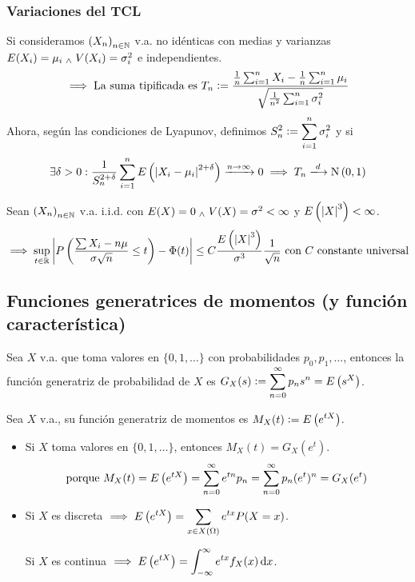 
\subsubsection{Variaciones del TCL}

Si consideramos $\left(X_n\right)_{n\in \mathbb{N}}$ v.a. no idénticas con medias y varianzas $E(X_i) = \mu_i \; _{\wedge} \; V(X_i) = \sigma_i^2$ e independientes.
\[\implies \text{La suma tipificada es } T_n \vcentcolon= \frac{\frac{1}{n} \sum_{i=1}^{n} X_i - \frac{1}{n}\sum_{i=1}^{n} \mu_i}{\sqrt{\frac{1}{n^2}\sum_{i=1}^{n} \sigma_i^2}}\]
Ahora, según las condiciones de Lyapunov, definimos $\displaystyle S_n^2 \vcentcolon= \sum_{i=1}^{n} \sigma_i^2$ y si
\[\exists \delta > 0 : \frac{1}{S_n^{2+\delta}} \sum_{i=1}^{n} E\left(\abs{X_i - \mu_i}^{2+\delta}\right) \xrightarrow{n\to\infty} 0 \implies T_n \xlongrightarrow{d} \normal{0,1}\]

\begin{teo}
	Sean $\left(X_n\right)_{n\in \mathbb{N}}$ v.a. i.i.d. con $E(X) = 0 \; _{\wedge} \; V(X) = \sigma^2 < \infty$ y $E\left(\left|X\right|^3\right) < \infty$.
	\[\implies \sup_{t\in \mathbb{R}} \left|P\left(\frac{\sum X_i - n\mu}{\sigma \sqrt{n}} \leq t\right) - \Phi(t)\right| \leq C \frac{E\left(\left|X\right|^3\right)}{\sigma^3}\frac{1}{\sqrt{n}} \text{ con } C \text{ constante universal}\]
\end{teo}

\subsection{Funciones generatrices de momentos (y función característica)}

 Sea $X$ v.a. que toma valores en $\{0, 1, \dots\}$ con probabilidades $p_0, p_1, \dots$, entonces la función generatriz de probabilidad de $X$ es $\displaystyle G_X(s) \vcentcolon= \sum_{n=0}^{\infty} p_n s^n = E\left(s^X\right)$.

\begin{defn}
	Sea $X$ v.a., su función generatriz de momentos  es $\displaystyle M_X(t) \vcentcolon= E\left(e^{tX}\right)$.
\end{defn}

\begin{obs}
	\begin{itemize}
		\item Si $X$ toma valores en $\{0, 1, \dots\}$, entonces $M_X(t) = G_X(e^t)$.
		      \[\text{porque }M_X(t) = E\left(e^{tX}\right) = \sum_{n=0}^{\infty} e^{tn}p_n = \sum_{n=0}^{\infty} p_n (e^t)^n = G_X(e^t)\]
		\item Si $X$ es discreta $\displaystyle \implies E\left(e^{tX}\right) = \sum_{x \in X(\Omega)} e^{tx}P(X=x)$.

		      Si $X$ es continua $\ds \implies E\left(e^{tX}\right) = \int_{-\infty}^{\infty} e^{tx}f_X(x)\odif{x}$.
	\end{itemize}
\end{obs}

